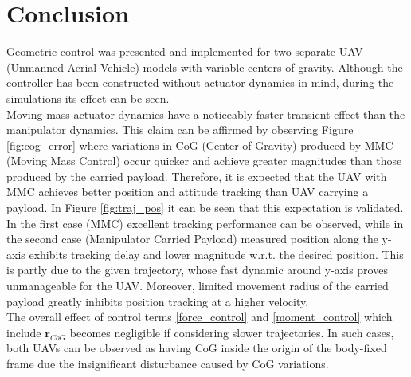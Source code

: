 \section{Conclusion} \label{sec:conclusion}
Geometric control was presented and implemented for two separate UAV (Unmanned Aerial Vehicle) models with variable centers of gravity. Although the controller has been constructed without actuator dynamics in mind, during the simulations its effect can be seen. \\
Moving mass actuator dynamics have a noticeably faster transient effect than the manipulator dynamics. This claim can be affirmed by observing Figure \ref{fig:cog_error} where variations in CoG (Center of Gravity) produced by MMC (Moving Mass Control) occur quicker and achieve greater magnitudes than those produced by the carried payload. Therefore, it is expected that the UAV with MMC achieves better position and attitude tracking than UAV carrying a payload. In Figure \ref{fig:traj_pos} it can be seen that this expectation is validated. \\
In the first case (MMC) excellent tracking performance can be observed, while in the second case (Manipulator Carried Payload) measured position along the y-axis exhibits tracking delay and lower magnitude w.r.t. the desired position. This is partly due to the given trajectory, whose fast dynamic around y-axis proves unmanageable for the UAV. Moreover, limited movement radius of the carried payload greatly inhibits position tracking at a higher velocity. \\   
The overall effect of control terms \eqref{force_control} and \eqref{moment_control} which include $\textbf{r}_{CoG}$ becomes negligible if considering slower trajectories. In such cases, both UAVs can be observed as having CoG inside the origin of the body-fixed frame due the insignificant disturbance caused by CoG variations. 
